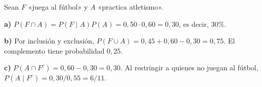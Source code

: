 Sean $F$ «juega al fútbol» y $A$ «practica atletismo».

\textbf{a)} $P(F\cap A)=P(F\mid A)P(A)=0{,}50\cdot0{,}60=0{,}30$, es decir, $\boxed{30\%}$.

\textbf{b)} Por inclusión y exclusión, $P(F\cup A)=0{,}45+0{,}60-0{,}30=0{,}75$. El complemento tiene probabilidad $\boxed{0{,}25}$.

\textbf{c)} $P(A\cap F^c)=0{,}60-0{,}30=0{,}30$. Al restringir a quienes no juegan al fútbol, $P(A\mid F^c)=0{,}30/0{,}55=\boxed{6/11}$.
